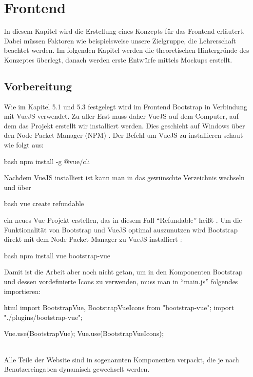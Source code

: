 \section{Frontend}
In diesem Kapitel wird die Erstellung eines Konzepts für das Frontend erläutert. Dabei müssen Faktoren wie beispielsweise unsere Zielgruppe, die Lehrerschaft beachtet werden. Im folgenden Kapitel werden die theoretischen Hintergründe des Konzeptes überlegt, danach werden erste Entwürfe mittels Mockups erstellt. 
\subsection{Vorbereitung}
Wie im Kapitel 5.1 und 5.3 festgelegt wird im Frontend Bootstrap in Verbindung mit VueJS verwendet. Zu aller Erst muss daher VueJS auf dem Computer, auf dem das Projekt erstellt wir installiert werden. Dies geschieht auf Windows über den Node Packet Manager (NPM) \cite{vue-install}. Der Befehl um VueJS zu installieren schaut wie folgt aus:
\begin{code}{bash}
	npm install -g @vue/cli
\end{code}
Nachdem VueJS installiert ist kann man in das gewünschte Verzeichnis wechseln und über
\begin{code}{bash}
	vue create refundable
\end{code}
ein neues Vue Projekt erstellen, das in diesem Fall \enquote{Refundable} heißt \cite{vue-create-project}. Um die Funktionalität von Bootstrap und VueJS optimal auszunutzen wird Bootstrap direkt mit dem Node Packet Manager zu VueJS installiert \cite{bootstrap-vue-getting-started}:
\begin{code}{bash}
	npm install vue bootstrap-vue
\end{code}
Damit ist die Arbeit aber noch nicht getan, um in den Komponenten Bootstrap und dessen vordefinierte Icons zu verwenden, muss man in \enquote{main.js} folgendes importieren:
\begin{code}{html}
	import { BootstrapVue, BootstrapVueIcons } from "bootstrap-vue";
	import "./plugins/bootstrap-vue";
	
	Vue.use(BootstrapVue);
	Vue.use(BootstrapVueIcons);
\end{code}
	\label{list:requcommands} ~\\
Alle Teile der Website sind in sogenannten Komponenten verpackt, die je nach Benutzereingaben dynamisch gewechselt werden. 

